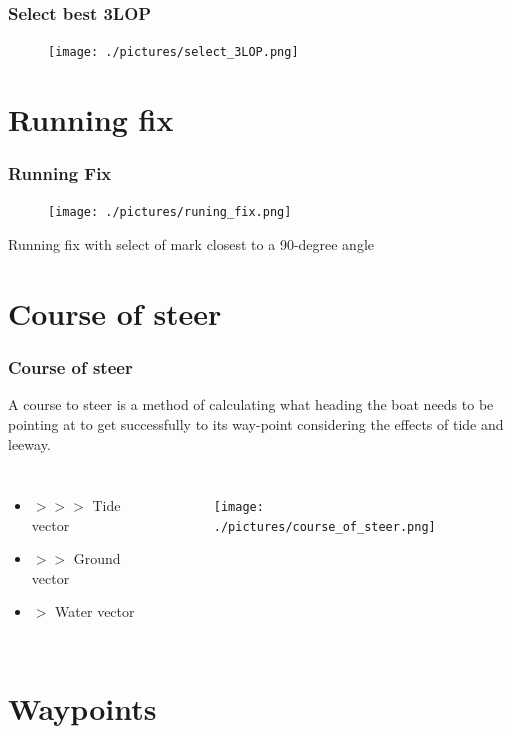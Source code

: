 \documentclass{beamer}
\begin{document}
\begin{frame}
    \frametitle{Select best 3LOP}
    \begin{figure}[h]
    \centering
    \texttt{[image: ./pictures/select\_3LOP.png]}
    \end{figure}
\end{frame}

\section{Running fix}

\begin{frame}
    \frametitle{Running Fix}
    \begin{figure}[h]
    \centering
    \texttt{[image: ./pictures/runing\_fix.png]}
    \end{figure}
    Running fix with select of mark closest to a 90-degree angle
\end{frame}

\section{Course of steer}

\begin{frame}
    \frametitle{Course of steer}

    A course to steer is a method of calculating what heading the boat needs to be pointing at to get successfully to its way-point considering the effects of tide and leeway. 
    \begin{columns}

        \begin{itemize}
            \item $ >>> $ Tide vector
            \item $ >> $ Ground vector
            \item $ > $ Water vector
        \end{itemize}
    
        \begin{figure}[h]
        \centering
        \texttt{[image: ./pictures/course\_of\_steer.png]}
        \end{figure}
    
    \end{columns}
\end{frame}

\section{Waypoints}
\end{document}
